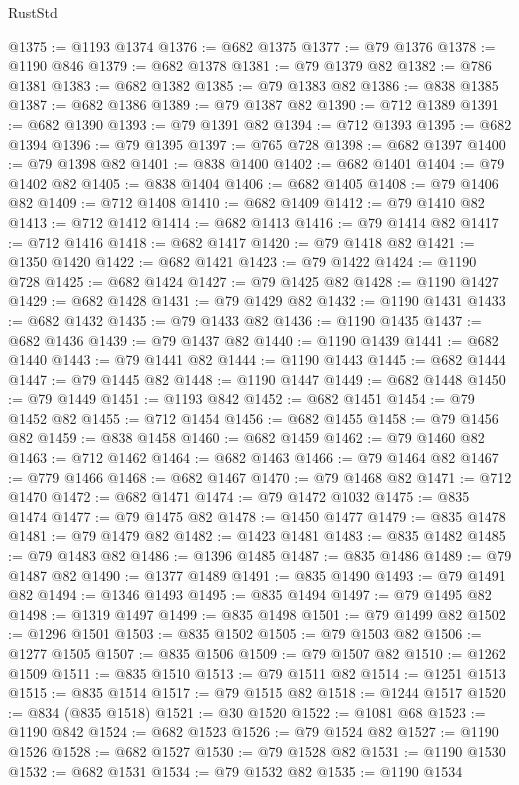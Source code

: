 \begin{lexlean}{RustStd}
\begin{coremodule}
{\begin{coremodule}
{{{{{{{{{{{{{{{{{{{{{{{{{{{{{{{@1375 := @1193 @1374
@1376 := @682 @1375
@1377 := @79 @1376
@1378 := @1190 @846
@1379 := @682 @1378
@1381 := @79 @1379 @82
@1382 := @786 @1381
@1383 := @682 @1382
@1385 := @79 @1383 @82
@1386 := @838 @1385
@1387 := @682 @1386
@1389 := @79 @1387 @82
@1390 := @712 @1389
@1391 := @682 @1390
@1393 := @79 @1391 @82
@1394 := @712 @1393
@1395 := @682 @1394
@1396 := @79 @1395
@1397 := @765 @728
@1398 := @682 @1397
@1400 := @79 @1398 @82
@1401 := @838 @1400
@1402 := @682 @1401
@1404 := @79 @1402 @82
@1405 := @838 @1404
@1406 := @682 @1405
@1408 := @79 @1406 @82
@1409 := @712 @1408
@1410 := @682 @1409
@1412 := @79 @1410 @82
@1413 := @712 @1412
@1414 := @682 @1413
@1416 := @79 @1414 @82
@1417 := @712 @1416
@1418 := @682 @1417
@1420 := @79 @1418 @82
@1421 := @1350 @1420
@1422 := @682 @1421
@1423 := @79 @1422
@1424 := @1190 @728
@1425 := @682 @1424
@1427 := @79 @1425 @82
@1428 := @1190 @1427
@1429 := @682 @1428
@1431 := @79 @1429 @82
@1432 := @1190 @1431
@1433 := @682 @1432
@1435 := @79 @1433 @82
@1436 := @1190 @1435
@1437 := @682 @1436
@1439 := @79 @1437 @82
@1440 := @1190 @1439
@1441 := @682 @1440
@1443 := @79 @1441 @82
@1444 := @1190 @1443
@1445 := @682 @1444
@1447 := @79 @1445 @82
@1448 := @1190 @1447
@1449 := @682 @1448
@1450 := @79 @1449
@1451 := @1193 @842
@1452 := @682 @1451
@1454 := @79 @1452 @82
@1455 := @712 @1454
@1456 := @682 @1455
@1458 := @79 @1456 @82
@1459 := @838 @1458
@1460 := @682 @1459
@1462 := @79 @1460 @82
@1463 := @712 @1462
@1464 := @682 @1463
@1466 := @79 @1464 @82
@1467 := @779 @1466
@1468 := @682 @1467
@1470 := @79 @1468 @82
@1471 := @712 @1470
@1472 := @682 @1471
@1474 := @79 @1472 @1032
@1475 := @835 @1474
@1477 := @79 @1475 @82
@1478 := @1450 @1477
@1479 := @835 @1478
@1481 := @79 @1479 @82
@1482 := @1423 @1481
@1483 := @835 @1482
@1485 := @79 @1483 @82
@1486 := @1396 @1485
@1487 := @835 @1486
@1489 := @79 @1487 @82
@1490 := @1377 @1489
@1491 := @835 @1490
@1493 := @79 @1491 @82
@1494 := @1346 @1493
@1495 := @835 @1494
@1497 := @79 @1495 @82
@1498 := @1319 @1497
@1499 := @835 @1498
@1501 := @79 @1499 @82
@1502 := @1296 @1501
@1503 := @835 @1502
@1505 := @79 @1503 @82
@1506 := @1277 @1505
@1507 := @835 @1506
@1509 := @79 @1507 @82
@1510 := @1262 @1509
@1511 := @835 @1510
@1513 := @79 @1511 @82
@1514 := @1251 @1513
@1515 := @835 @1514
@1517 := @79 @1515 @82
@1518 := @1244 @1517
@1520 := @834 (@835 @1518)
@1521 := @30 @1520
@1522 := @1081 @68
@1523 := @1190 @842
@1524 := @682 @1523
@1526 := @79 @1524 @82
@1527 := @1190 @1526
@1528 := @682 @1527
@1530 := @79 @1528 @82
@1531 := @1190 @1530
@1532 := @682 @1531
@1534 := @79 @1532 @82
@1535 := @1190 @1534
}}}}}}}}}}}}}}}}}}}}}}}}}}}}}}}
\end{coremodule}}
\end{coremodule}
\end{lexlean}
